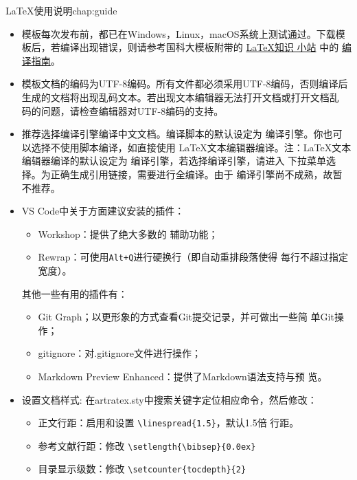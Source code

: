 \begin{cuzchapter}{\LaTeX{}使用说明}{chap:guide}
	\begin{itemize}
		\item 模板每次发布前，都已在Windows，Linux，macOS系统上测试通过。下载模
		      板后，若编译出现错误，则请参考国科大模板附带的
		      \href{https://github.com/mohuangrui/ucasthesis/wiki}{\LaTeX{}知识
			      小站} 中的
		      \href{https://github.com/mohuangrui/ucasthesis/wiki/%E7%BC%96%E8%AF%91%E6%8C%87%E5%8D%97}{编
			      译指南}。
		\item 模板文档的编码为UTF-8编码。所有文件都必须采用UTF-8编码，否则编译后
		      生成的文档将出现乱码文本。若出现文本编辑器无法打开文档或打开文档乱
		      码的问题，请检查编辑器对UTF-8编码的支持。
		\item 推荐选择编译引擎编译中文文档。编译脚本的默认设定为
		      编译引擎。你也可以选择不使用脚本编译，如直接使用
		      \LaTeX{}文本编辑器编译。注：\LaTeX{}文本编辑器编译的默认设定为
		      编译引擎，若选择编译引擎，请进入
		      下拉菜单选择。为正确生成引用链接，需要进行全编译。由于
		      编译引擎尚不成熟，故暂不推荐。
		\item VS Code中关于方面建议安装的插件：
		      \begin{itemize}
			      \item {} Workshop：提供了绝大多数的
			            辅助功能；
			      \item Rewrap：可使用\verb|Alt+Q|进行硬换行（即自动重排段落使得
			            每行不超过指定宽度）。
		      \end{itemize}
		      其他一些有用的插件有：
		      \begin{itemize}
			      \item Git Graph；以更形象的方式查看Git提交记录，并可做出一些简
			            单Git操作；
			      \item gitignore：对.gitignore文件进行操作；
			      \item Markdown Preview Enhanced：提供了Markdown语法支持与预
			            览。
		      \end{itemize}
		\item 设置文档样式: 在artratex.sty中搜索关键字定位相应命令，然后修改：
		      \begin{itemize}
			      \item 正文行距：启用和设置 \verb|\linespread{1.5}|，默认1.5倍
			            行距。
			      \item 参考文献行距：修改 \verb|\setlength{\bibsep}{0.0ex}|
			      \item 目录显示级数：修改 \verb|\setcounter{tocdepth}{2}|

\end{itemize}
\end{itemize}
\end{cuzchapter}
